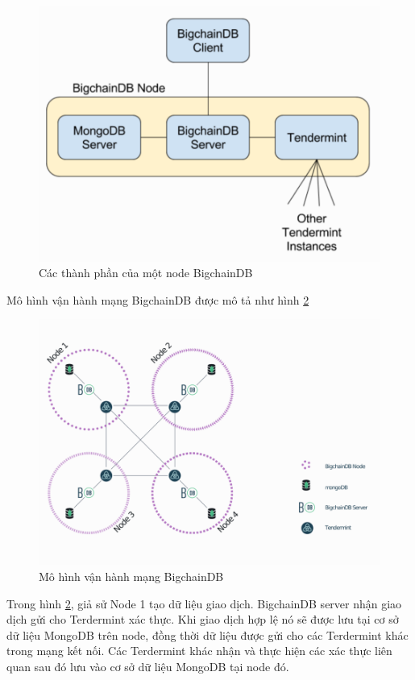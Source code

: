 \begin{figure}[htbp]
\centering
\includegraphics[width=.9\linewidth]{img/bigchaindb_mechanism.png}
\caption{Các thành phần của một node BigchainDB}
\label{fig:bigchaindb_mechaism}
\end{figure}

Mô hình vận hành mạng BigchainDB được mô tả như hình \ref{fig:bigchaindb_communication}

\begin{figure}[htbp]
\centering
\includegraphics[width=.9\linewidth]{img/bigchaindb_communication.png}
\caption{Mô hình vận hành mạng BigchainDB}
\label{fig:bigchaindb_communication}
\end{figure}

Trong hình \ref{fig:bigchaindb_communication}, giả sử Node 1 tạo dữ liệu giao dịch. BigchainDB server nhận giao dịch gửi cho Terdermint xác thực. Khi giao dịch hợp lệ nó sẽ được lưu tại cơ sở dữ liệu MongoDB trên node, đồng thời dữ liệu được gửi cho các Terdermint khác trong mạng kết nối. Các Terdermint khác nhận và thực hiện các xác thực liên quan sau đó lưu vào cơ sở dữ liệu MongoDB tại node đó.

